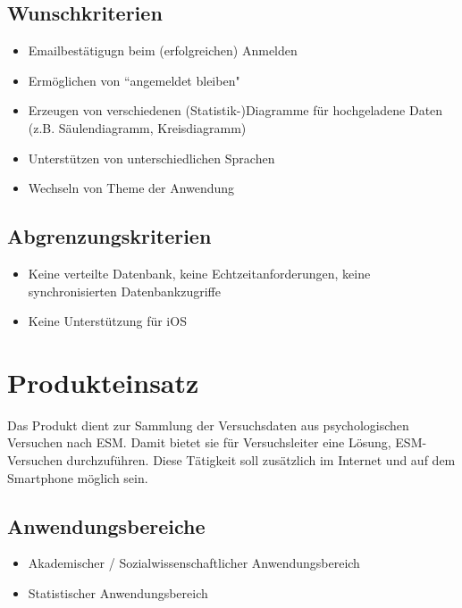 \documentclass[a4paper]{scrreprt}
\begin{document}
        \section{Wunschkriterien}
            \begin{itemize}
                \item Emailbest\"atigugn beim (erfolgreichen) Anmelden
                \item Erm\"oglichen von ``angemeldet bleiben"
                \item Erzeugen von verschiedenen (Statistik-)Diagramme f\"ur hochgeladene Daten (z.B. S\"aulendiagramm, Kreisdiagramm) 
                \item Unterst\"utzen von unterschiedlichen Sprachen
                \item Wechseln von Theme der Anwendung
            \end{itemize}
 
        \section{Abgrenzungskriterien}
            \begin{itemize}
                \item Keine verteilte Datenbank, keine Echtzeitanforderungen, keine synchronisierten Datenbankzugriffe
                \item Keine Unterst\"utzung f\"ur iOS
            \end{itemize}
 
    \chapter{Produkteinsatz}
        Das Produkt dient zur Sammlung der Versuchsdaten aus psychologischen Versuchen nach ESM. Damit bietet sie für Versuchsleiter eine Lösung, ESM-Versuchen durchzuführen. Diese Tätigkeit soll zusätzlich im Internet und auf dem Smartphone möglich sein.
 
        \section{Anwendungsbereiche}
            \begin{itemize}
                \item Akademischer / Sozialwissenschaftlicher Anwendungsbereich
                \item Statistischer Anwendungsbereich
            \end{itemize}
 
\end{document}
